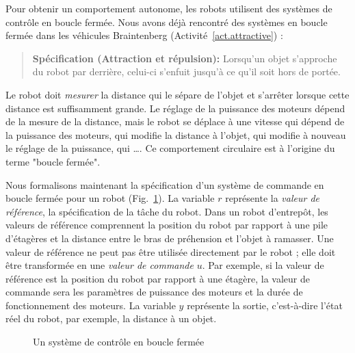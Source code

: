 Pour obtenir un comportement autonome, les robots utilisent des systèmes de contrôle en boucle fermée. Nous avons déjà rencontré des systèmes en boucle fermée dans les véhicules Braintenberg (Activité~\ref{act.attractive}) :
\begin{quote}
\normalsize\noindent\textbf{Spécification (Attraction et répulsion):} Lorsqu'un objet s'approche du robot par derrière, celui-ci s'enfuit jusqu'à ce qu'il soit hors de portée.
\end{quote}
Le robot doit \emph{mesurer} la distance qui le sépare de l'objet et s'arrêter lorsque cette distance est suffisamment grande. Le réglage de la puissance des moteurs dépend de la mesure de la distance, mais le robot se déplace à une vitesse qui dépend de la puissance des moteurs, qui modifie la distance à l'objet, qui modifie à nouveau le réglage de la puissance, qui \ldots. Ce comportement circulaire est à l'origine du terme "boucle fermée".

Nous formalisons maintenant la spécification d'un système de commande en boucle fermée pour un robot (Fig.~\ref{fig.control-model}). La variable $r$ représente la \emph{valeur de référence}, la spécification de la tâche du robot. Dans un robot d'entrepôt, les valeurs de référence comprennent la position du robot par rapport à une pile d'étagères et la distance entre le bras de préhension et l'objet à ramasser. Une valeur de référence ne peut pas être utilisée directement par le robot ; elle doit être transformée en une \emph{valeur de commande} $u$. Par exemple, si la valeur de référence est la position du robot par rapport à une étagère, la valeur de commande sera les paramètres de puissance des moteurs et la durée de fonctionnement des moteurs. La variable $y$ représente la sortie, c'est-à-dire l'état réel du robot, par exemple, la distance à un objet.

\begin{figure}
\begin{center}
\caption{Un système de contrôle en boucle fermée}\label{fig.control-model}
\end{center}
\end{figure}

